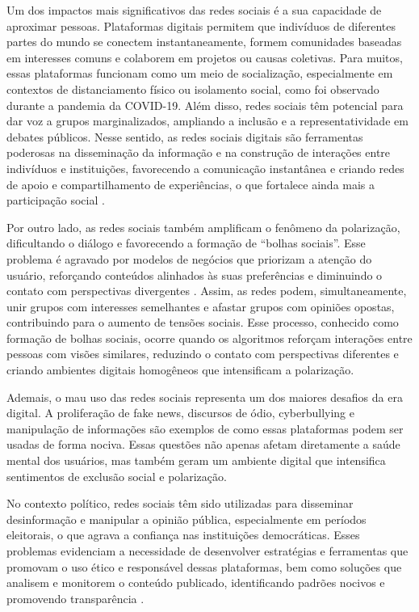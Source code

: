 \documentclass[
	12pt,				%
	oneside,			%
	a4paper,			%
	english,			%
	french,				%
	spanish,			%
	brazil				%
	]{abntex2}
\begin{document}
Um dos impactos mais significativos das redes sociais é a sua capacidade
de aproximar pessoas. Plataformas digitais permitem que indivíduos de
diferentes partes do mundo se conectem instantaneamente, formem
comunidades baseadas em interesses comuns e colaborem em projetos ou
causas coletivas. Para muitos, essas plataformas funcionam como um meio
de socialização, especialmente em contextos de distanciamento físico ou
isolamento social, como foi observado durante a pandemia da COVID-19.
Além disso, redes sociais têm potencial para dar voz a grupos
marginalizados, ampliando a inclusão e a representatividade em debates
públicos. Nesse sentido, as redes sociais digitais são ferramentas
poderosas na disseminação da informação e na construção de interações
entre indivíduos e instituições, favorecendo a comunicação instantânea e
criando redes de apoio e compartilhamento de experiências, o que
fortalece ainda mais a participação social \cite{lima2021redes}.

Por outro lado, as redes sociais também amplificam o fenômeno da
polarização, dificultando o diálogo e favorecendo a formação de ``bolhas
sociais''. Esse problema é agravado por modelos de negócios que
priorizam a atenção do usuário, reforçando conteúdos alinhados às suas
preferências e diminuindo o contato com perspectivas divergentes
\cite{de2020democracia}​. Assim, as redes podem, simultaneamente, unir
grupos com interesses semelhantes e afastar grupos com opiniões opostas,
contribuindo para o aumento de tensões sociais. Esse processo, conhecido
como formação de bolhas sociais, ocorre quando os algoritmos reforçam
interações entre pessoas com visões similares, reduzindo o contato com
perspectivas diferentes e criando ambientes digitais homogêneos que
intensificam a polarização.

Ademais, o mau uso das redes sociais representa um dos maiores desafios
da era digital. A proliferação de fake news, discursos de ódio,
cyberbullying e manipulação de informações são exemplos de como essas
plataformas podem ser usadas de forma nociva. Essas questões não apenas
afetam diretamente a saúde mental dos usuários, mas também geram um
ambiente digital que intensifica sentimentos de exclusão social e
polarização.

No contexto político, redes sociais têm sido utilizadas para disseminar
desinformação e manipular a opinião pública, especialmente em períodos
eleitorais, o que agrava a confiança nas instituições democráticas.
Esses problemas evidenciam a necessidade de desenvolver estratégias e
ferramentas que promovam o uso ético e responsável dessas plataformas,
bem como soluções que analisem e monitorem o conteúdo publicado,
identificando padrões nocivos e promovendo transparência
\cite{siqueira2024impacto}.
\end{document}
